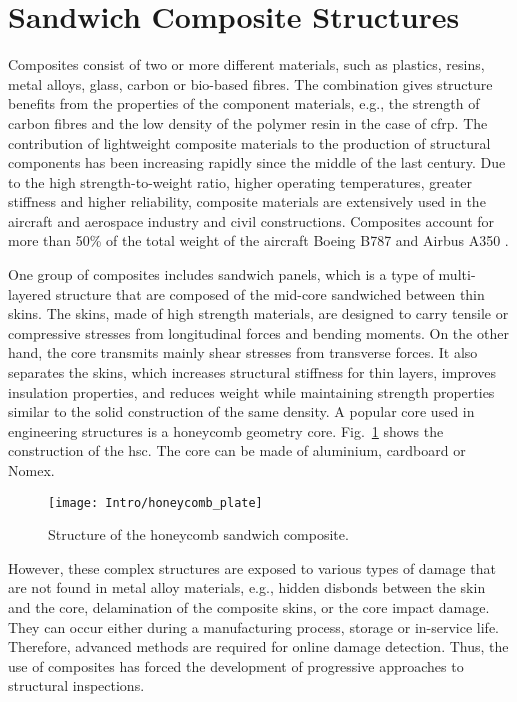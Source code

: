 \section{Sandwich Composite Structures}
\label{sec:scs}

Composites consist of two or more different materials, such as plastics, resins, metal alloys, glass, carbon or bio-based fibres. The combination gives  structure benefits from the properties of the component materials, e.g., the strength of carbon fibres and the low density of the polymer resin in the case of \ac{cfrp}.
The contribution of lightweight composite materials to the production of structural components has been increasing rapidly since the middle of the last century.
Due to the high strength-to-weight ratio, higher operating temperatures, greater stiffness and higher
reliability, composite materials are extensively used in the aircraft and aerospace industry and civil constructions.
Composites account for more than 50\% of the total weight of the aircraft Boeing B787 and Airbus A350 \cite{giurgiutiu2015structural}.

One group of composites includes sandwich panels, which is a type of multi-layered structure that are composed of the mid-core sandwiched between thin skins.
The skins, made of high strength materials, are designed to carry tensile or compressive stresses from longitudinal forces and bending moments.
On the other hand, the core transmits mainly shear stresses from transverse forces.
It also separates the skins, which increases structural stiffness for thin layers, improves insulation properties, and reduces weight while maintaining strength properties similar to the solid construction of the same density.
A popular core used in engineering structures is a honeycomb geometry core.
Fig.~\ref{fig:hcp} shows the construction of the \ac{hsc}.
The core can be made of aluminium, cardboard or Nomex. 
\begin{figure}[H] %
	\begin{center}
		\texttt{[image: Intro/honeycomb\_plate]}
		\caption{
			\label{fig:hcp} Structure of the honeycomb sandwich composite.}
		\vspace{-0.5cm}
	\end{center}
\end{figure}

However, these complex structures are exposed to various types of damage that are not found in metal alloy materials, e.g., hidden disbonds between the skin and the core, delamination of the composite skins, or the core impact damage.
They can occur either during a manufacturing process, storage or in-service life.
Therefore, advanced methods are required for online damage detection.
Thus, the use of composites has forced the development of progressive approaches to structural inspections.